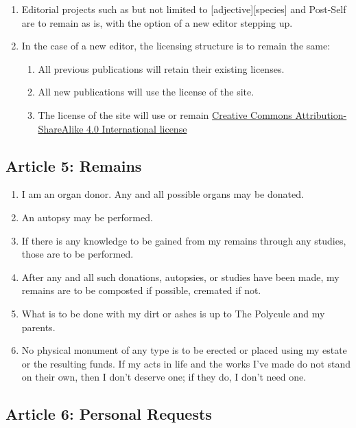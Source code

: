 \begin{enumerate}
\def\labelenumi{\arabic{enumi}.}
\tightlist
\item
  Editorial projects such as but not limited to {[}adjective{]}{[}species{]} and Post-Self are to remain as is, with the option of a new editor stepping up.
\item
  In the case of a new editor, the licensing structure is to remain the same:

  \begin{enumerate}
  \def\labelenumii{\arabic{enumii}.}
  \tightlist
  \item
    All previous publications will retain their existing licenses.
  \item
    All new publications will use the license of the site.
  \item
    The license of the site will use or remain \href{https://creativecommons.org/licenses/by-sa/4.0/}{Creative Commons Attribution-ShareAlike 4.0 International license}
  \end{enumerate}
\end{enumerate}

\subsection*{Article 5: Remains}\label{article-5-remains}

\begin{enumerate}
\def\labelenumi{\arabic{enumi}.}
\tightlist
\item
  I am an organ donor. Any and all possible organs may be donated.
\item
  An autopsy may be performed.
\item
  If there is any knowledge to be gained from my remains through any studies, those are to be performed.
\item
  After any and all such donations, autopsies, or studies have been made, my remains are to be composted if possible, cremated if not.
\item
  What is to be done with my dirt or ashes is up to The Polycule and my parents.
\item
  No physical monument of any type is to be erected or placed using my estate or the resulting funds. If my acts in life and the works I've made do not stand on their own, then I don't deserve one; if they do, I don't need one.
\end{enumerate}

\subsection*{Article 6: Personal Requests}\label{article-6-personal-requests}

